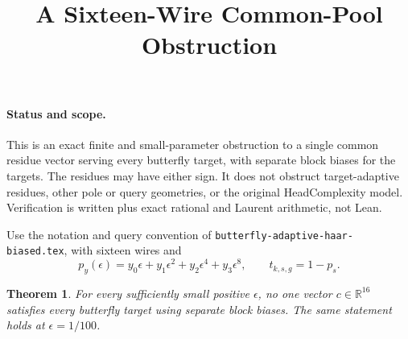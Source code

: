 \documentclass[11pt]{article}
\title{A Sixteen-Wire Common-Pool Obstruction}
\author{}\date{}
\newtheorem{theorem}{Theorem}
\begin{document}
\maketitle
\paragraph{Status and scope.}
This is an exact finite and small-parameter obstruction to a single
common residue vector serving every butterfly target, with separate
block biases for the targets. The residues may have either sign.
It does not obstruct target-adaptive residues, other pole or query
geometries, or the original HeadComplexity model. Verification is
written plus exact rational and Laurent arithmetic, not Lean.

Use the notation and query convention of
\texttt{butterfly-adaptive-haar-biased.tex}, with sixteen wires and
\[
 p_y(\epsilon)=y_0\epsilon+y_1\epsilon^2+y_2\epsilon^4+y_3\epsilon^8,
 \qquad t_{k,s,g}=1-p_s.
\]
\begin{theorem}
For every sufficiently small positive $\epsilon$, no one vector
$c\in\mathbb R^{16}$ satisfies every butterfly target using separate
block biases. The same statement holds at $\epsilon=1/100$.
\end{theorem}
\end{document}
